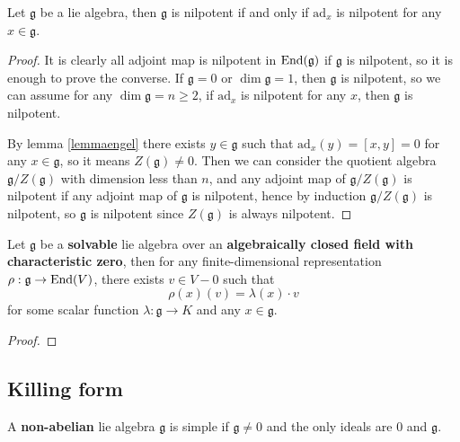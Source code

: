 \begin{colortheorem}
    Let \(\mathfrak{g}\) be a lie algebra, then \(\mathfrak{g}\) is nilpotent if and only if \(\mathrm{ad}_x\) is nilpotent for any \(x \in \mathfrak{g}\).
\end{colortheorem}

\begin{proof}
    It is clearly all adjoint map is nilpotent in \(\operatorname{End}(\mathfrak{g})\) if \(\mathfrak{g}\) is nilpotent, so it is enough to prove the converse. If \(\mathfrak{g}= 0\) or \(\dim \mathfrak{g} = 1\), then \(\mathfrak{g}\) is nilpotent, so we can assume for any \(\dim \mathfrak{g} = n \geq 2\), if \(\mathrm{ad}_x\) is nilpotent for any \(x\), then \(\mathfrak{g}\) is nilpotent. 

    By lemma \ref{lemmaengel} there exists \(y \in \mathfrak{g}\) such that \(\mathrm{ad}_x(y) = [x,y] =0\) for any \(x \in \mathfrak{g}\), so it means \(Z(\mathfrak{g}) \neq 0\). Then we can consider the quotient algebra \(\mathfrak{g}/Z(\mathfrak{g})\) with dimension less than \(n\), and any adjoint map of \(\mathfrak{g}/Z(\mathfrak{g})\) is nilpotent if any adjoint map of \(\mathfrak{g}\) is nilpotent, hence by induction \(\mathfrak{g}/Z(\mathfrak{g})\) is nilpotent, so \(\mathfrak{g}\) is nilpotent since \(Z(\mathfrak{g})\) is always nilpotent.
\end{proof}

\begin{colortheorem}
    Let \(\mathfrak{g}\) be a \textbf{solvable} lie algebra over an \textbf{algebraically closed field with characteristic zero}, then for any finite-dimensional representation \(\rho: \mathfrak{g} \to \operatorname{End}(V)\), there exists \(v \in V-{0}\) such that 
    \[\rho(x)(v)  = \lambda(x) \cdot v\]
    for some scalar function \(\lambda: \mathfrak{g} \to K\) and any \(x \in \mathfrak{g}\).
\end{colortheorem}

\begin{proof}
    
\end{proof}

\subsection{Killing form}

\begin{colordefinition}
    A \textbf{non-abelian} lie algebra \(\mathfrak{g}\) is simple if \(\mathfrak{g} \neq 0\) and the only ideals are \(0\) and \(\mathfrak{g}\).
\end{colordefinition}

